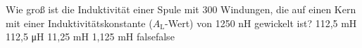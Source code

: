     {Wie groß ist die Induktivität einer Spule mit 300 Windungen, die auf einen Kern mit einer Induktivitätskonstante ($A_{\textrm{L}}$-Wert) von 1250 nH gewickelt ist?}
    {112,5 mH}
    {112,5 \si{\micro\henry}}
    {11,25 mH}
    {1,125 mH}
    {false}{false}